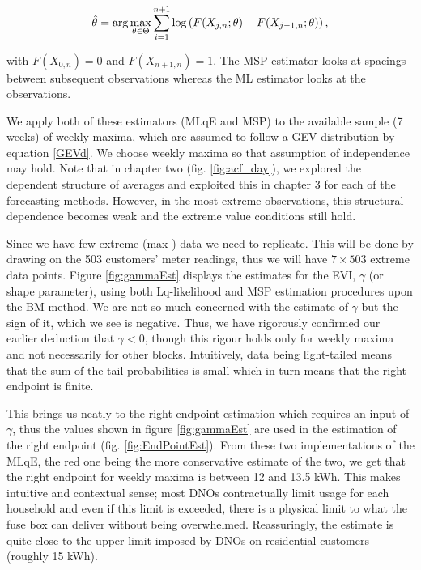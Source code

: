 \begin{equation*}
\hat{\theta} = \displaystyle {\arg\max_{\theta \in \Theta}} \sum\limits_{i=1}^{n+1} \log \left( F(X_{j,n};\theta) - F(X_{j-1,n};\theta) \right),
\end{equation*}

\noindent with $F(X_{0,n}) = 0$ and $F(X_{n+1,n}) = 1$. %
The MSP estimator looks at spacings between subsequent observations whereas the ML estimator looks at the observations.

We apply both of these estimators (MLqE and MSP) to the available sample (7 weeks) of weekly maxima, which are assumed to follow a GEV distribution by equation \ref{GEVd}. We choose weekly maxima so that assumption of independence may hold. Note that in chapter two (fig. \ref{fig:acf_day}), we explored the dependent structure of averages and exploited this in chapter 3 for each of the forecasting methods. However, in the most extreme observations, this structural dependence becomes weak and the extreme value conditions still hold.

Since we have few extreme (max-) data we need to replicate. This will be done by drawing on the 503 customers' meter readings, thus we will have $7 \times 503$ extreme data points. Figure \ref{fig:gammaEst} displays the estimates for the EVI, $\gamma$ (or shape parameter), using both Lq-likelihood and MSP estimation procedures upon the BM method. We are not so much concerned with the estimate of $\gamma$ but the sign of it, which we see is negative. Thus, we have rigorously confirmed our earlier deduction that $\gamma <0$, though this rigour holds only for weekly maxima and not necessarily for other blocks. Intuitively, data being light-tailed means that the sum of the tail probabilities is small which in turn means that the right endpoint is finite. 

This brings us neatly to the right endpoint estimation which requires an input of $\gamma$, thus the values shown in figure \ref{fig:gammaEst} are used in the estimation of the right endpoint (fig. \ref{fig:EndPointEst}). From these two implementations of the MLqE, the red one being the more conservative estimate of the two, we get that the right endpoint for weekly maxima is between 12 and 13.5 kWh. This makes intuitive and contextual sense; most DNOs contractually limit usage for each household and even if this limit is exceeded, there is a physical limit to what the fuse box can deliver without being overwhelmed.  Reassuringly, the estimate is quite close to the upper limit imposed by DNOs on residential customers (roughly 15 kWh).

